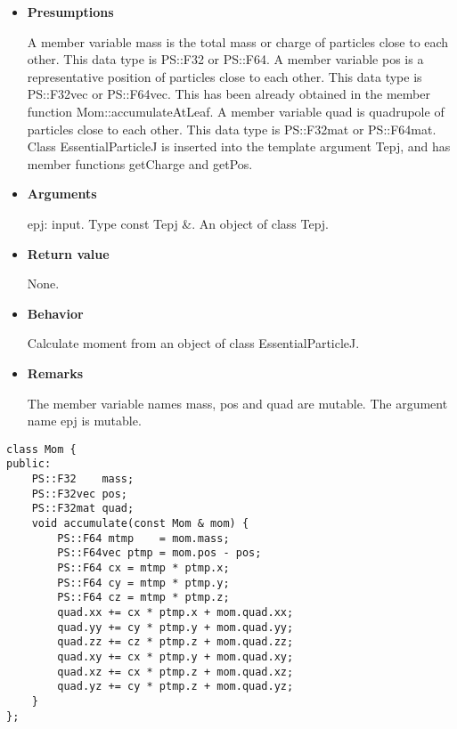 \begin{itemize}

\item {\bf Presumptions}

  A member variable mass is the total mass or charge of particles
  close to each other. This data type is PS::F32 or PS::F64. A member
  variable pos is a representative position of particles close to each
  other. This data type is PS::F32vec or PS::F64vec. This has been
  already obtained in the member function Mom::accumulateAtLeaf. A
  member variable quad is quadrupole of particles close to each
  other. This data type is PS::F32mat or PS::F64mat. Class
  EssentialParticleJ is inserted into the template argument Tepj, and
  has member functions getCharge and getPos.  

\item {\bf Arguments}

  epj: input. Type const Tepj \&. An object of class Tepj.
  
\item {\bf Return value}

  None.

\item {\bf Behavior}

  Calculate moment from an object of class EssentialParticleJ.
  
\item {\bf Remarks}

  The member variable names mass, pos and quad are mutable. The
  argument name epj is mutable.  

\end{itemize}


\begin{screen}
\begin{verbatim}
class Mom {
public:
    PS::F32    mass;
    PS::F32vec pos;
    PS::F32mat quad;
    void accumulate(const Mom & mom) {
        PS::F64 mtmp    = mom.mass;
        PS::F64vec ptmp = mom.pos - pos;
        PS::F64 cx = mtmp * ptmp.x;
        PS::F64 cy = mtmp * ptmp.y;
        PS::F64 cz = mtmp * ptmp.z;
        quad.xx += cx * ptmp.x + mom.quad.xx;
        quad.yy += cy * ptmp.y + mom.quad.yy;
        quad.zz += cz * ptmp.z + mom.quad.zz;
        quad.xy += cx * ptmp.y + mom.quad.xy;
        quad.xz += cx * ptmp.z + mom.quad.xz;
        quad.yz += cy * ptmp.z + mom.quad.yz;
    }
};
\end{verbatim}
\end{screen}

